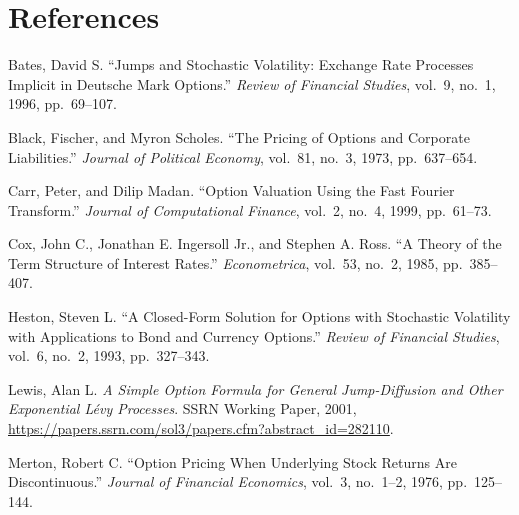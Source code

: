 \documentclass[12pt,a4paper]{article}
\begin{document}
\newpage
\section*{References}

\begingroup
{}
\noindent
Bates, David S. ``Jumps and Stochastic Volatility: Exchange Rate Processes Implicit in Deutsche Mark Options.'' \textit{Review of Financial Studies}, vol.\ 9, no.\ 1, 1996, pp.\ 69--107.

\medskip\noindent
Black, Fischer, and Myron Scholes. ``The Pricing of Options and Corporate Liabilities.'' \textit{Journal of Political Economy}, vol.\ 81, no.\ 3, 1973, pp.\ 637--654.

\medskip\noindent
Carr, Peter, and Dilip Madan. ``Option Valuation Using the Fast Fourier Transform.'' \textit{Journal of Computational Finance}, vol.\ 2, no.\ 4, 1999, pp.\ 61--73.

\medskip\noindent
Cox, John C., Jonathan E. Ingersoll Jr., and Stephen A. Ross. ``A Theory of the Term Structure of Interest Rates.'' \textit{Econometrica}, vol.\ 53, no.\ 2, 1985, pp.\ 385--407.

\medskip\noindent
Heston, Steven L. ``A Closed-Form Solution for Options with Stochastic Volatility with Applications to Bond and Currency Options.'' \textit{Review of Financial Studies}, vol.\ 6, no.\ 2, 1993, pp.\ 327--343.

\medskip\noindent
Lewis, Alan L. \textit{A Simple Option Formula for General Jump-Diffusion and Other Exponential L\'evy Processes}. SSRN Working Paper, 2001, \url{https://papers.ssrn.com/sol3/papers.cfm?abstract_id=282110}.

\medskip\noindent
Merton, Robert C. ``Option Pricing When Underlying Stock Returns Are Discontinuous.'' \textit{Journal of Financial Economics}, vol.\ 3, no.\ 1--2, 1976, pp.\ 125--144.
\endgroup
\end{document}
